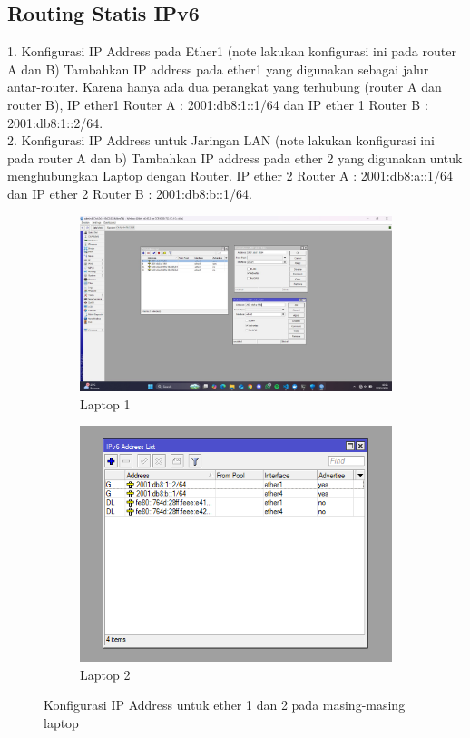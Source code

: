 \subsection{Routing Statis IPv6}
1. Konfigurasi IP Address pada Ether1 (note lakukan konfigurasi ini pada router A dan B) Tambahkan IP address pada ether1 yang digunakan sebagai jalur antar-router. Karena hanya ada dua perangkat yang terhubung (router A dan router B), IP ether1 Router A : 2001:db8:1::1/64 dan IP ether 1 Router B : 2001:db8:1::2/64. \\ 
2. Konfigurasi IP Address untuk Jaringan LAN (note lakukan konfigurasi ini pada router A dan b) Tambahkan IP address pada ether 2 yang digunakan untuk menghubungkan Laptop dengan Router. IP ether 2 Router A : 2001:db8:a::1/64 dan IP ether 2 Router B : 2001:db8:b::1/64. 
\begin{figure}[H]
    \centering
    \begin{subfigure}[b]{0.3\linewidth}
      \centering
      \includegraphics[width=\linewidth]{image/statis2.jpg}
      \caption{Laptop 1}
    \end{subfigure}
    \hspace{1cm}
    \begin{subfigure}[b]{0.3\linewidth}
      \centering
      \includegraphics[width=\linewidth]{image/statis1.png}
      \caption{Laptop 2}
    \end{subfigure}
    \caption{Konfigurasi IP Address untuk ether 1 dan 2 pada masing-masing laptop}
\end{figure}
